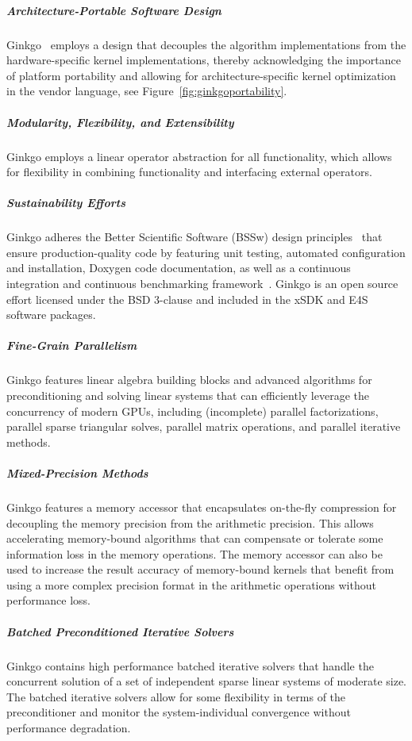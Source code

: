   \subparagraph{Architecture-Portable Software Design}
		Ginkgo~\cite{anzt2020ginkgo} employs a design that decouples the
		algorithm implementations from the hardware-specific kernel
		implementations, thereby acknowledging the importance of platform
		portability and allowing for architecture-specific kernel optimization
		in the vendor language, see Figure~\ref{fig:ginkgoportability}.
  \subparagraph{Modularity, Flexibility, and Extensibility} Ginkgo employs a
		linear operator abstraction for all functionality, which allows for
		flexibility in combining functionality and interfacing external
		operators.
  \subparagraph{Sustainability Efforts} Ginkgo adheres the Better Scientific
		Software (BSSw) design principles~\cite{betterscientificsoftware} that
		ensure production-quality code by featuring unit testing, automated
		configuration and installation, Doxygen code documentation, as well as a
		continuous integration and continuous benchmarking
		framework~\cite{pasc_anzt}. Ginkgo is an open source effort licensed
		under the BSD 3-clause and included in the xSDK and E4S software
		packages.
  \subparagraph{Fine-Grain Parallelism} Ginkgo features linear algebra
		building blocks and advanced algorithms for preconditioning and solving
		linear systems that can efficiently leverage the concurrency of modern
		GPUs, including (incomplete) parallel factorizations, parallel sparse
		triangular solves, parallel matrix operations, and parallel iterative
		methods.
  \subparagraph{Mixed-Precision Methods} Ginkgo features a memory accessor
		that encapsulates on-the-fly compression for decoupling the memory
		precision from the arithmetic precision. This allows accelerating
		memory-bound algorithms that can compensate or tolerate some information
		loss in the memory operations. The memory accessor can also be used to
		increase the result accuracy of memory-bound kernels that benefit from
		using a more complex precision format in the arithmetic operations
		without performance loss.
  \subparagraph{Batched Preconditioned Iterative Solvers} Ginkgo contains high
		performance batched iterative solvers that handle the concurrent
		solution of a set of independent sparse linear systems of moderate size.
		The batched iterative solvers allow for some flexibility in terms of the
		preconditioner and monitor the system-individual convergence without
		performance degradation.


